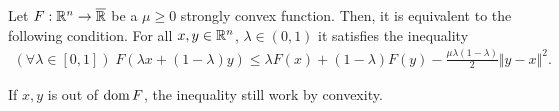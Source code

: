 \documentclass[12pt]{article}
\begin{document}
        \begin{theorem}\label{thm:jesen}
            Let $F: \mathbb R^n \rightarrow \overline {\mathbb R}$ be a $\mu \ge 0$ strongly convex function. 
            Then, it is equivalent to the following condition. 
            For all $x, y \in \mathbb R^n$, $\lambda \in (0, 1)$ it satisfies the inequality 
            \begin{align*}
                (\forall \lambda \in [0, 1])\; 
                F(\lambda x + (1 - \lambda)y) \le \lambda F(x) + (1 - \lambda)F(y) -\frac{\mu\lambda(1 - \lambda)}{2} \Vert y - x\Vert^2. 
            \end{align*}
        \end{theorem}
        \begin{remark}
            If $x, y$ is out of $\operatorname{dom} F$, the inequality still work by convexity. 
        \end{remark}
    
\end{document}
